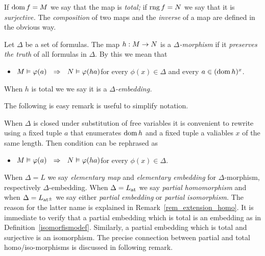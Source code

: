 If $\mathop{\rm dom} f = M$ we say that the map is \emph{total;} if $\mathop{\rm rng} f=N$ we say that it is \emph{surjective.}
The \emph{composition\/} of two maps and the \emph{inverse\/} of a map are defined in the obvious way.

\begin{definition}\label{defpreservaveritas}
Let $\Delta$ be a set of formulas.
The map $h:M\rightarrow N$ is a \emph{$\Delta$-morphism\/} if it  \emph{preserves the truth\/} of all formulas in $\Delta$.
By this we mean that
\begin{itemize}
\item[p.] $M\models\phi(a)\ \ \IMP\ \ N\models\phi(ha)$\hfill for every $\phi(x)\in\Delta$ and every $a\in(\mathop{\rm dom} h)^{x}$.
\end{itemize}
\smallskip
When $h$ is total we we say it is a  \emph{$\Delta$-embedding.}
\end{definition}

The following is easy remark is useful to simplify notation.

\begin{remark}\label{rem_Delta_morphism_notation}
When $\Delta$ is closed under substitution of free variables it is convenient to rewrite  using a fixed tuple $a$ that enumerates $\mathop{\rm dom} h$ and a fixed tuple a valiables $x$ of the same length. 
Then condition  can be rephrased as

\begin{itemize}
\item[p$'$.] $M\models\phi(a)\ \ \IMP\ \ N\models\phi(ha)$\hfill for every $\phi(x)\in\Delta$.
\end{itemize}
\smallskip
\end{remark}

When $\Delta=L$ we say \emph{elementary map\/} and \emph{elementary embedding\/} for $\Delta$-morphism, respectively $\Delta$-embedding.
When  $\Delta=L_{\rm at}$ we say \emph{partial homomorphism\/} and when $\Delta=L_{\rm at^{\scriptscriptstyle\pm}}$ we say either \emph{partial embedding\/} or \emph{partial isomorphism.}
The reason for the latter name is explained in Remark~\ref{rem_extension_homo}.
It is immediate to verify that a partial embedding which is total is an embedding as in Definition~\ref{isomorfismodef}.
Similarly, a partial embedding which is total and surjective is an isomorphism.
The precise connection between partial and total homo/iso-morphisms is discussed in following remark.

